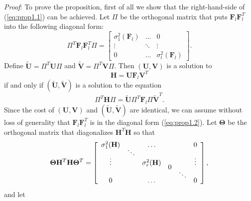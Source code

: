 \documentclass[12pt,onecolumn,draftcls]{IEEEtran}
\newcommand{\bF}{\mathbf{F}}
\newcommand{\bH}{\mathbf{H}}
\begin{document}
\noindent
\textit{Proof}:
To prove the proposition, first of all we show that the right-hand-side of (\ref{eq:prop1.1}) can be achieved.
Let $\Pi$ be the orthogonal matrix that puts $\bF_l \bF_l^T$ into the following diagonal form:
\begin{equation}
\Pi^T \bF_l\bF_l^T  \Pi =
\left[
\begin{array}{ccc}
\sigma_1^2(\mathbf{F}_l) & \ldots   &  0 \\
\vdots & \ddots  &\vdots   \\
0  &  \ldots &   \sigma_l^2(\mathbf{F}_l)
\end{array}
\right].
\label{eq:prop1.2}
\end{equation}
Define $\mathbf{\tilde{U}}=\Pi^T \mathbf{U} \Pi$ and $\mathbf{\tilde{V}}=\Pi^T \mathbf{V} \Pi$.
Then $(\mathbf{U}, \mathbf{V})$ is a solution to
\begin{equation}
\mathbf{H}=\mathbf{U}\mathbf{F}_l\mathbf{V}^T
\label{eq:prop1.3}
\end{equation}
if and only if $(\mathbf{\tilde{U}},\mathbf{\tilde{V}})$
is a solution to the equation
\begin{equation}
\Pi^T \bH \Pi = \mathbf{\tilde{U}} \Pi^T \bF_l \Pi \mathbf{\tilde{V}}^T.
\end{equation}
Since the cost of $(\mathbf{U}, \mathbf{V})$ and $(\mathbf{\tilde{U}},\mathbf{\tilde{V}})$ are identical, we can assume
without loss of generality that $\bF_l \bF_l^T$ is in the diagonal form (\ref{eq:prop1.2}).
Let $\mathbf{\Theta}$ be the orthogonal matrix that diagonalizes $\mathbf{H}^T\mathbf{H}$ so that
\begin{equation}
\mathbf{\Theta} \mathbf{H}^T \mathbf{H} \mathbf{\Theta}^T =
\left[
\begin{array}{cccccc}
\sigma_1^2(\mathbf{H}) && \ldots   &  && 0  \vspace{-0.2cm}\\
&\ddots&&&& \vspace{-0.2cm}\\
\vdots&&\sigma_r^2(\mathbf{H})&&&\vdots \vspace{-0.2cm}\\
&&& 0&& \vspace{-0.2cm}\\
&&&& \ddots  &   \vspace{-0.2cm}\\
0 & &  \ldots && &  0
\end{array}
\right],
\label{eq:THETA}
\end{equation}
and let
\end{document}
